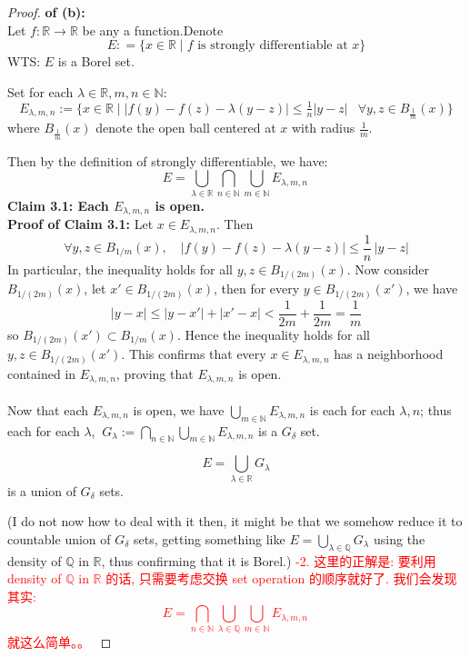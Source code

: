 \documentclass[lang=cn,11pt]{elegantbook}
\begin{document}
\begin{proof}
   \textbf{ of (b):}\\
Let $f\colon\mathbb{R}\to\mathbb{R}$ be any a function.Denote \[ E: = \{x\in \mathbb{R}\mid f \text{ is strongly differentiable at } x\}\]
WTS: $E$ is a Borel set.

Set for each $\lambda \in \mathbb{R}, m,n\in\mathbb{N}$: \[ E_{\lambda,m,n}:=\{x\in \mathbb{R} \mid |f(y)-f(z)-\lambda(y-z)|\le\tfrac1n|y-z|\   \;\; \forall y,z \in B_{\frac{1}{m}}(x)\}\]
where $ B_{\frac{1}{m}}(x)$ denote the open ball centered at $x$ with radius $\frac{1}{m}$.

Then by the definition of strongly differentiable, we have: \[
   E=\bigcup_{\lambda\in\mathbb{R}}\bigcap_{n\in\mathbb{N}}\bigcup_{m\in\mathbb{N}} E_{\lambda,m,n}\,
   \]
\noindent \textbf{Claim 3.1: Each $ E_{\lambda,m,n}$ is open.}\\
\textbf{Proof of Claim 3.1:} Let \(x\in E_{\lambda,m,n}\). Then
\[\forall y,z\in B_{1/m}(x),\quad \bigl|f(y)-f(z)-\lambda(y-z)\bigr|\le \frac1n\,|y -z|\]
In particular, the inequality holds for all \(y,z\in B_{1/(2m)}(x)\). Now consider $B_{1/(2m)}(x)$, let $x' \in B_{1/(2m)}(x)$, then for every \(y\in B_{1/(2m)}(x')\), we have \[
|y-x|\le |y-x'|+|x'-x|<\frac{1}{2m}+\frac{1}{2m}=\frac{1}{m} \]
so \(B_{1/(2m)}(x')\subset B_{1/m}(x)\). Hence the inequality holds for all \(y,z\in B_{1/(2m)}(x')\). This confirms that every \(x\in E_{\lambda,m,n}\) has a neighborhood contained in \(E_{\lambda,m,n}\), proving that \(E_{\lambda,m,n}\) is open.\\\\


Now that each $ E_{\lambda,m,n}$ is open, we have $\bigcup_{m\in\mathbb{N}} E_{\lambda,m,n}$ is each for each $\lambda , n$; thus each for each $\lambda$, \(\ G_\lambda := \bigcap_{n\in\mathbb{N}}\bigcup_{m\in\mathbb{N}} E_{\lambda,m,n}\) is a $G_\delta$ set.

\[E = \bigcup_{\lambda\in\mathbb{R}} G_\lambda \]
is a union of $G_\delta$ sets.

(I do not now how to deal with it then, it might be that we somehow reduce it to countable union of $G_\delta$ sets, getting something like $E = \bigcup_{\lambda\in\mathbb{Q}} G_\lambda $ using the density of $\mathbb{Q}$ in $\mathbb{R}$, thus confirming that it is Borel.)
\textcolor{red}{-2. 这里的正解是: 要利用 density of $\mathbb{Q}$ in $\mathbb{R}$ 的话, 只需要考虑交换 set operation 的顺序就好了. 我们会发现其实: \[
  E=\bigcap_{n\in\mathbb{N}} \bigcup_{\lambda\in\mathbb{Q}} \bigcup_{m\in\mathbb{N}} E_{\lambda,m,n}\,
\]就这么简单。。
}
\end{proof}
\end{document}
